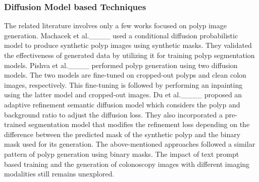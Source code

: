 \subsubsection*{Diffusion Model based Techniques}
The related literature involves only a few works focused on polyp image generation. Machacek et al.____ used a conditional diffusion probabilistic model to produce synthetic polyp images using synthetic masks. They validated the effectiveness of generated data by utilizing it for training polyp segmentation models. Pishva et al.____ performed polyp generation using two diffusion models. The two models are fine-tuned on cropped-out polyps and clean colon images, respectively. This fine-tuning is followed by performing an inpainting using the latter model and cropped-out images. Du et al.____ proposed an adaptive reﬁnement semantic diﬀusion model which considers the polyp and background ratio to adjust the diffusion loss. They also incorporated a pre-trained segmentation model that modifies the refinement loss depending on the difference between the predicted mask of the synthetic polyp and the binary mask used for its generation. The above-mentioned approaches followed a similar pattern of polyp generation using binary masks. The impact of text prompt based training and the generation of colonoscopy images with different imaging modalities still remains unexplored.